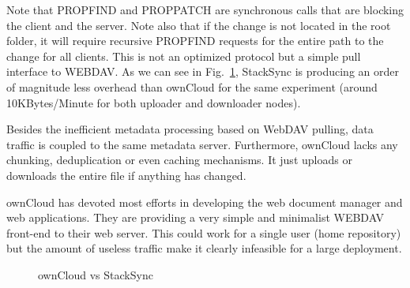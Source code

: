 Note that PROPFIND and PROPPATCH are synchronous calls that are blocking the client and the server. Note also that if the change is not located in the root folder, it will require recursive PROPFIND requests for the entire path to the change for all clients.  This is not an optimized protocol but a simple pull interface to WEBDAV. As we can see in Fig.~\ref{fig:owncloud},  StackSync is producing an order of magnitude less overhead  than ownCloud for the same experiment  (around 10KBytes/Minute for both uploader and downloader nodes). 


Besides the inefficient metadata processing based on WebDAV pulling, data traffic is coupled to the same metadata server. Furthermore, ownCloud lacks any chunking, deduplication or even caching mechanisms. It just uploads or downloads the entire file if anything has changed.

ownCloud has devoted most efforts in developing the web document manager and web applications. They are providing a very simple and minimalist WEBDAV front-end  to their web server. This could work for a single user (home repository) but the amount of useless traffic make it clearly infeasible for a large deployment.

\begin{figure}[t]
  \centering
  \caption{ownCloud vs StackSync}
  \vspace{-5pt}
  \label{fig:owncloud}
\end{figure}

